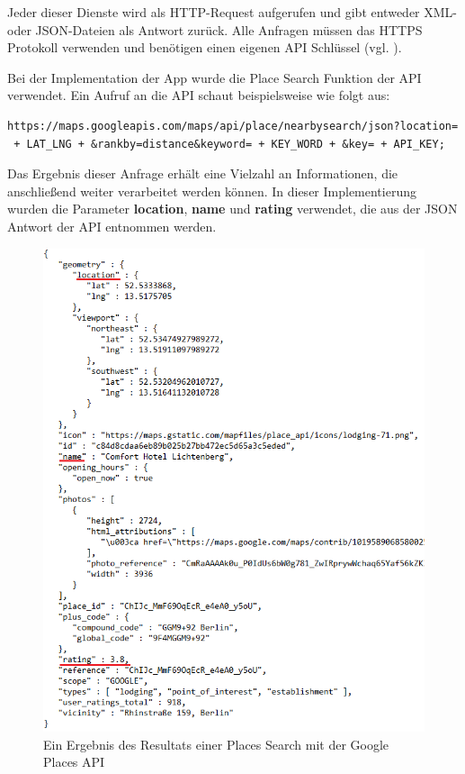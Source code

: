 Jeder dieser Dienste wird als HTTP-Request aufgerufen und gibt entweder XML- oder JSON-Dateien als Antwort zurück. Alle Anfragen müssen das HTTPS Protokoll verwenden und benötigen einen eigenen API Schlüssel (vgl. \cite{places_api}).

Bei der Implementation der App wurde die \glqq Place Search\grqq{} Funktion der API verwendet. Ein Aufruf an die API schaut beispielsweise wie folgt aus:

\begin{lstlisting}[basicstyle=\small]
https://maps.googleapis.com/maps/api/place/nearbysearch/json?location=
 + LAT_LNG + &rankby=distance&keyword= + KEY_WORD + &key= + API_KEY;
\end{lstlisting}

Das Ergebnis dieser Anfrage erhält eine Vielzahl an Informationen, die anschließend weiter verarbeitet werden können. In dieser Implementierung wurden die Parameter \textbf{location}, \textbf{name} und \textbf{rating} verwendet, die aus der JSON Antwort der API entnommen werden.

\begin{figure}[H]
	\centering
	\includegraphics[scale=0.75]{location_result.png}
	\caption{Ein Ergebnis des Resultats einer Places Search mit der Google Places API}
\end{figure} 

